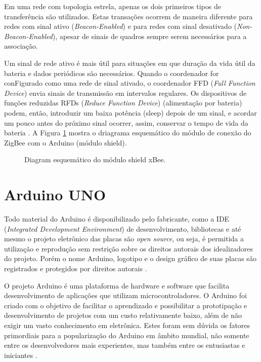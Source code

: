 \documentclass[12pt,report]{uftpibic}
\begin{document}
Em uma rede com topologia estrela, apenas os dois primeiros tipos de transferência são utilizados. Estas transações ocorrem de maneira diferente para redes com sinal ativo ({\it Beacon-Enabled}) e para redes com sinal desativado ({\it Non-Beacon-Enabled}), apesar de sinais de quadros sempre serem necessários para a associação.

Um sinal de rede ativo é mais útil para situações em que duração da vida útil da bateria e dados periódicos são necessários. Quando o coordenador for conFigurado como uma rede de sinal ativado, o coordenador FFD ({\it Full Function Device}) envia sinais de transmissão em intervalos regulares. Os dispositivos de funções reduzidas RFDs ({\it Reduce Function Device}) (alimentação por bateria) podem, então, introduzir um baixa potência (sleep) depois de um sinal, e acordar um pouco antes do próximo sinal ocorrer, assim, conservar o tempo de vida da bateria \cite{marcos}. A Figura \ref{fig:xbee} mostra o driagrama esquemático do módulo de conexão do ZigBee com o Arduino (módulo shield).

\begin{figure}[!h]
\centering
\caption{Diagram esquemático do módulo shield xBee.}
\label{fig:xbee}
\end{figure}

\section{Arduino UNO}

Todo material do Arduino é disponibilizado pelo fabricante, como a IDE ({\it Integrated Development Environment}) de desenvolvimento, bibliotecas e até mesmo o projeto eletrônico das placas são {\it open source}, ou seja, é permitida a utilização e reprodução sem restrição sobre os direitos autorais dos idealizadores do projeto. Porém o nome Arduino, logotipo e o design gráfico de suas placas são registrados e protegidos por direitos autorais \cite{marcos}.

O projeto Arduino é uma plataforma de hardware e software que facilita desenvolvimento de aplicações que utilizam microcontroladores. O Arduino foi criado com o objetivo de facilitar o aprendizado e possibilitar a prototipação e desenvolvimento de projetos com um custo relativamente baixo, além de não exigir um vasto conhecimento em eletrônica. Estes foram sem dúvida os fatores primordiais para a popularização do Arduino em âmbito mundial, não somente entre os desenvolvedores mais experientes, mas também entre os entusiastas e iniciantes \cite{marcos}.
\end{document}
